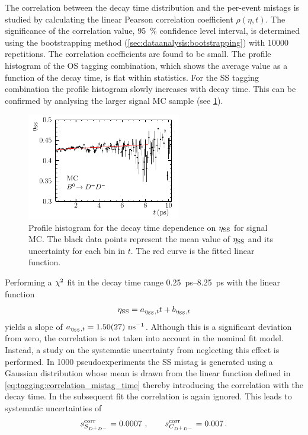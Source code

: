 The correlation between the decay time distribution and the per-event mistags
is studied by calculating the linear Pearson correlation coefficient
$\rho(\eta,t)$. The significance of the correlation value, \ie
\SI{95}{\percent} confidence level interval, is determined using the
bootstrapping method (\cref{sec:dataanalysis:bootstrapping}) with \num{10000}
repetitions. The correlation coefficients are found to be small. The profile
histogram of the OS tagging combination, which shows the average \etaos value
as a function of the decay time, is flat within statistics. For the SS tagging
combination the profile histogram slowly increases with decay time. This can
be confirmed by analysing the larger signal MC sample (see
\cref{fig:b02dd:systematics:correlation_mistag_time:etass_time_profile_MC}).
\begin{figure}[htb]
\centering
\includegraphics[width=0.6\textwidth]{07-B02DD/tikz/pdf/Profile_DecayTime_SS.pdf}
\caption{Profile histogram for the decay time dependence on $\etass$ for
signal MC. The black data points represent the mean value of $\etass$ and its
uncertainty for each bin in $t$. The red curve is the fitted linear function.}
\label{fig:b02dd:systematics:correlation_mistag_time:etass_time_profile_MC}
\end{figure}
Performing a $\chisq$ fit in the decay time range \SIrange{0.25}{8.25}{\ps}
with the linear function
\begin{align}
  \etass = a_{\etass,t} t + b_{\etass,t}
  \label{eq:tagging:correlation_mistag_time}
\end{align}
yields a slope of $a_{\etass,t} = \SI{1.50\pm0.27}{\invns}$. Although this is
a significant deviation from zero, the correlation is not taken into account in
the nominal fit model. Instead, a study on the systematic uncertainty from
neglecting this effect is performed. In \num{1000} pseudoexperiments the SS
mistag is generated using a Gaussian distribution whose mean is drawn from the
linear function defined in \cref{eq:tagging:correlation_mistag_time} thereby
introducing the correlation with the decay time. In the subsequent fit the
correlation is again ignored. This leads to systematic uncertainties of
\begin{align*}
s_{\SDD}^{\text{corr}} = \num{0.0007}\ , \qquad s_{\CDD}^{\text{corr}} = \num{0.007}\,.
\end{align*}

